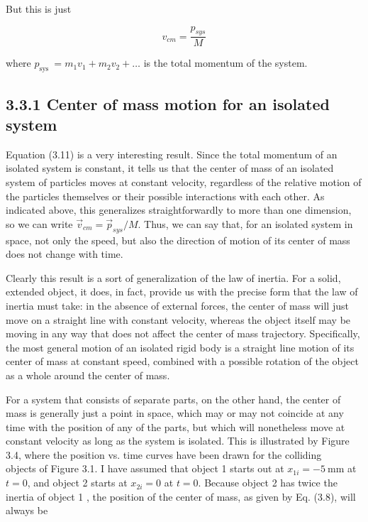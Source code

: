\documentclass[10pt]{article}
\begin{document}
But this is just


\begin{equation*}
v_{c m}=\frac{p_{s y s}}{M} \tag{3.11}
\end{equation*}


where $p_{\text {sys }}=m_{1} v_{1}+m_{2} v_{2}+\ldots$ is the total momentum of the system.

\subsection*{3.3.1 Center of mass motion for an isolated system}
Equation (3.11) is a very interesting result. Since the total momentum of an isolated system is constant, it tells us that the center of mass of an isolated system of particles moves at constant velocity, regardless of the relative motion of the particles themselves or their possible interactions with each other. As indicated above, this generalizes straightforwardly to more than one dimension, so we can write $\vec{v}_{c m}=\vec{p}_{s y s} / M$. Thus, we can say that, for an isolated system in space, not only the speed, but also the direction of motion of its center of mass does not change with time.

Clearly this result is a sort of generalization of the law of inertia. For a solid, extended object, it does, in fact, provide us with the precise form that the law of inertia must take: in the absence of external forces, the center of mass will just move on a straight line with constant velocity, whereas the object itself may be moving in any way that does not affect the center of mass trajectory. Specifically, the most general motion of an isolated rigid body is a straight line motion of its center of mass at constant speed, combined with a possible rotation of the object as a whole around the center of mass.

For a system that consists of separate parts, on the other hand, the center of mass is generally just a point in space, which may or may not coincide at any time with the position of any of the parts, but which will nonetheless move at constant velocity as long as the system is isolated. This is illustrated by Figure 3.4, where the position vs. time curves have been drawn for the colliding\\
objects of Figure 3.1. I have assumed that object 1 starts out at $x_{1 i}=-5 \mathrm{~mm}$ at $t=0$, and object 2 starts at $x_{2 i}=0$ at $t=0$. Because object 2 has twice the inertia of object 1 , the position of the center of mass, as given by Eq. (3.8), will always be
\end{document}
